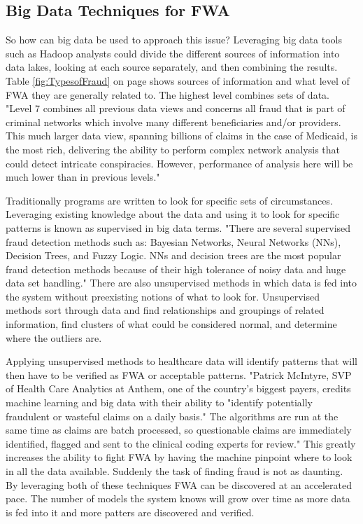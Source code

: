 \documentclass[sigconf]{acmart}
\begin{document}
\subsection{Big Data Techniques for FWA}

So how can big data be used to approach this issue?  Leveraging big data tools such as Hadoop analysts could divide the different sources of information into data lakes, looking at each source separately, and then combining the results.  Table \ref{fig:TypesofFraud} on page \pageref{fig:TypesofFraud} shows sources of information and what level of FWA they are generally related to.  The highest level combines sets of data.  "Level 7 combines all previous data views and concerns all fraud that is part of criminal networks which involve many different beneficiaries and/or providers. This much larger data view, spanning billions of claims in the case of Medicaid, is the most rich, delivering the ability to perform complex network analysis that could detect intricate conspiracies. However, performance of analysis here will be much lower than in previous levels."\cite{THORNTON20131252} 

Traditionally programs are written to look for specific sets of circumstances.  Leveraging existing knowledge about the data and using it to look for specific patterns is known as supervised in big data terms.  "There are several supervised fraud detection methods such as: Bayesian Networks, Neural Networks (NNs), Decision Trees, and Fuzzy Logic. NNs and decision trees are the most popular fraud detection methods because of their high tolerance of noisy data and huge data set handling."  There are also unsupervised methods in which data is fed into the system without preexisting notions of what to look for\cite{Ghuse}.  Unsupervised methods sort through data and find relationships and groupings of related information, find clusters of what could be considered normal, and determine where the outliers are.  

Applying unsupervised methods to healthcare data will identify patterns that will then have to be verified as FWA or acceptable patterns.  "Patrick McIntyre, SVP of Health Care Analytics at Anthem, one of the country's biggest payers, credits machine learning and big data with their ability to "identify potentially fraudulent or wasteful claims on a daily basis." The algorithms are run at the same time as claims are batch processed, so questionable claims are immediately identified, flagged and sent to the clinical coding experts for review."\cite{Datameer}  This greatly increases the ability to fight FWA by having the machine pinpoint where to look in all the data available.  Suddenly the task of finding fraud is not as daunting.  By leveraging both of these techniques FWA can be discovered at an accelerated pace.  The number of models the system knows will grow over time as more data is fed into it and more patters are discovered and verified.
\end{document}
